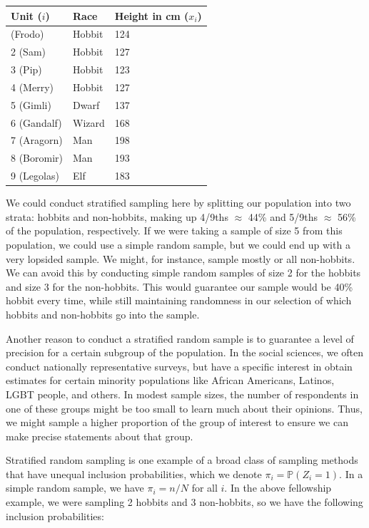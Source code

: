 \documentclass[
  letterpaper,
  DIV=11,
  numbers=noendperiod]{scrreprt}
\renewcommand{\P}{\mathbb{P}}
\theoremstyle{definition}
\theoremstyle{definition}
\theoremstyle{plain}
\theoremstyle{remark}
\begin{document}
\begin{longtable}[]{@{}lll@{}}
\toprule\noalign{}
Unit (\(i\)) & Race & Height in cm (\(x_i\)) \\
\midrule\noalign{}
\endhead
\bottomrule\noalign{}
\endlastfoot
1 (Frodo) & Hobbit & 124 \\
2 (Sam) & Hobbit & 127 \\
3 (Pip) & Hobbit & 123 \\
4 (Merry) & Hobbit & 127 \\
5 (Gimli) & Dwarf & 137 \\
6 (Gandalf) & Wizard & 168 \\
7 (Aragorn) & Man & 198 \\
8 (Boromir) & Man & 193 \\
9 (Legolas) & Elf & 183 \\
\end{longtable}

We could conduct stratified sampling here by splitting our population
into two strata: hobbits and non-hobbits, making up 4/9ths \(\approx\)
44\% and 5/9ths \(\approx\) 56\% of the population, respectively. If we
were taking a sample of size 5 from this population, we could use a
simple random sample, but we could end up with a very lopsided sample.
We might, for instance, sample mostly or all non-hobbits. We can avoid
this by conducting simple random samples of size 2 for the hobbits and
size 3 for the non-hobbits. This would guarantee our sample would be
40\% hobbit every time, while still maintaining randomness in our
selection of which hobbits and non-hobbits go into the sample.

Another reason to conduct a stratified random sample is to guarantee a
level of precision for a certain subgroup of the population. In the
social sciences, we often conduct nationally representative surveys, but
have a specific interest in obtain estimates for certain minority
populations like African Americans, Latinos, LGBT people, and others. In
modest sample sizes, the number of respondents in one of these groups
might be too small to learn much about their opinions. Thus, we might
sample a higher proportion of the group of interest to ensure we can
make precise statements about that group.

Stratified random sampling is one example of a broad class of sampling
methods that have unequal inclusion probabilities, which we denote
\(\pi_i = \P(Z_{i} = 1)\). In a simple random sample, we have
\(\pi_i = n/N\) for all \(i\). In the above fellowship example, we were
sampling 2 hobbits and 3 non-hobbits, so we have the following inclusion
probabilities:
\end{document}
